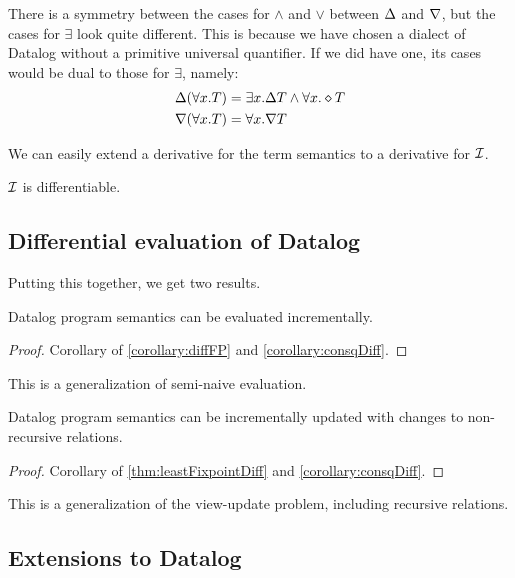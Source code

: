 There is a symmetry between the cases for $\wedge$ and $\vee$ between $\Delta$
and $\nabla$, but the cases for $\exists$ look quite different. 
This is because we have chosen a dialect of Datalog without a primitive universal quantifier.
If we did have one, its cases would be dual to those for $\exists$, namely:
\begin{align*}
\Delta(\forall x.T) &= \exists x. \Delta T \wedge \forall x. \diamond T\\
\nabla(\forall x.T) &= \forall x. \nabla T
\end{align*}

We can easily extend a derivative for the term semantics to a derivative for $\mathcal{I}$.

\begin{corollary}
\label{corollary:consqDiff}
  $\mathcal{I}$ is differentiable.
\end{corollary}

\subsection{Differential evaluation of Datalog}

Putting this together, we get two results.

\begin{thm}
\label{thm:diffEval}
  Datalog program semantics can be evaluated incrementally.
\end{thm}
\ifproofs
\begin{proof}
  Corollary of \cref{corollary:diffFP} and \cref{corollary:consqDiff}.
\end{proof}
\fi

This is a generalization of semi-naive evaluation.

\begin{thm}
\label{thm:diffUpdate}
  Datalog program semantics can be incrementally updated with changes to non-recursive relations.
\end{thm}
\ifproofs
\begin{proof}
  Corollary of \cref{thm:leastFixpointDiff} and \cref{corollary:consqDiff}.
\end{proof}
\fi

This is a generalization of the view-update problem, including recursive relations.

\subsection{Extensions to Datalog}

